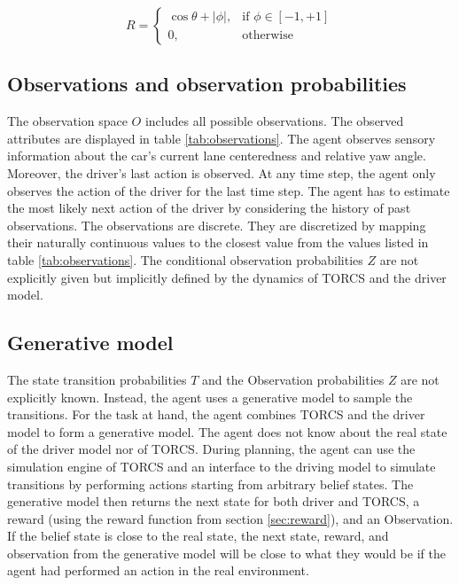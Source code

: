 \begin{equation}
    \label{eq:reward}
    R = 
    \begin{cases}
        \cos \theta + |\phi|,& \text{if } \phi \in [-1,+1]\\
        0,              & \text{otherwise}
    \end{cases}
\end{equation}

\subsection{Observations and observation probabilities}
\label{sec:observations}



\noindent
The observation space $O$ includes all possible observations. The observed attributes are displayed in table \ref{tab:observations}. The agent observes sensory information about the car's current lane centeredness and relative yaw angle. Moreover, the driver's last action is observed. At any time step, the agent only observes the action of the driver for the last time step. The agent has to estimate the most likely next action of the driver by considering the history of past observations. The observations are discrete. They are discretized by mapping their naturally continuous values to the closest value from the values listed in table \ref{tab:observations}. The conditional observation probabilities $Z$ are not explicitly given but implicitly defined by the dynamics of TORCS and the driver model.

\subsection{Generative model}
\label{sec:gen_model}

The state transition probabilities $T$ and the Observation probabilities $Z$ are not explicitly known. Instead, the agent uses a generative model to sample the transitions. For the task at hand, the agent combines TORCS and the driver model to form a generative model. The agent does not know about the real state of the driver model nor of TORCS. During planning, the agent can use the simulation engine of TORCS and an interface to the driving model to simulate transitions by performing actions starting from arbitrary belief states. The generative model then returns the next state for both driver and TORCS, a reward (using the reward function from section \ref{sec:reward}), and an Observation. If the belief state is close to the real state, the next state, reward, and observation from the generative model will be close to what they would be if the agent had performed an action in the real environment.

